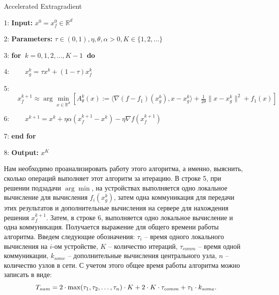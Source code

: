 \documentclass{article}
\theoremstyle{definition}
\theoremstyle{plain}
\begin{document}
\begin{algorithm}
\caption{Accelerated Extragradient}\label{alg:1}
\begin{algorithmic}
\item [1:] \textbf{Input:} $x^0 = x_f^0\in\mathbb R^d$
\item [2:] \textbf{Parameters:} $\tau\in (0, 1), \eta, \theta, \alpha > 0, K\in \{1, 2, \ldots\}$
\item [3:] \textbf{for~}$k = 0, 1, 2, \ldots, K-1$\textbf{~do}
\item [4:]    $\quad\quad x_g^k = \tau x^k + (1 - \tau)x_f^k$
\item [5:]    $\quad\quad x_f^{k+1} \approx \arg\underset{x\in\mathbb R^d}{\min} [A_{\theta}^k (x) := \langle \nabla (f - f_1)(x_g^k), x - x_g^k \rangle + \frac{1}{2\theta}\|x - x_g^k\|^2 + f_1(x)]$ 
\item [6:] $\quad\quad x^{k+1} = x^k + \eta\alpha(x_f^{k+1} - x^k) - \eta\nabla f(x_f^{k+1})$
\item [7:] \textbf{end for}
\item [8:] \textbf{Output:} $x^K$
\end{algorithmic}
\end{algorithm}

Нам необходимо проанализировать работу этого алгоритма, а именно, выяснить, сколько операций выполняет этот алгоритм за итерацию. В строке 5, при решении подзадачи $\arg\min$, на устройствах выполняется одно локальное вычисление для вычисления $f_i(x_g^k)$, затем одна коммуникация для передачи этих результатов и дополнительные вычисления на сервере для нахождения решения $x_f^{k+1}$. Затем, в строке 6, выполняется одно локальное вычисление и одна коммуникация. Получается выражение для общего времени работы алгоритма. Введем следующие обозначения: $\tau_i$ -- время одного локального вычисления на $i$-ом устройстве, $K$ -- количество итераций, $\tau_{comm}$ -- время одной коммуникации, $k_{some}$ -- дополнительные вычисления центрального узла, $n$ -- количество узлов в сети. С учетом этого общее время работы алгоритма можно записать в виде:
\begin{equation}
    \notag
    T_{sum} = 2\cdot\max(\tau_1, \tau_2, \ldots, \tau_n)\cdot K + 2\cdot K\cdot\tau_{comm} + \tau_1\cdot k_{some}.
\end{equation}
\end{document}

